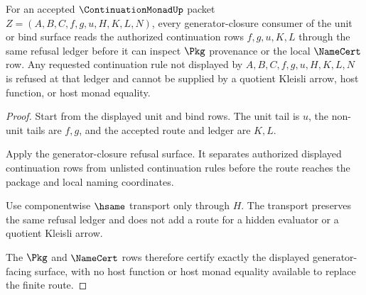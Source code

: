 \begin{theorem}
\label{thm:continuation-monad-generator-refusal-row}
For an accepted $\ContinuationMonadUp$ packet
$Z=(A,B,C,f,g,u,H,K,L,N)$, every generator-closure consumer of the unit or bind
surface reads the authorized continuation rows $f,g,u,K,L$ through the same
refusal ledger before it can inspect $\Pkg$ provenance or the local
$\NameCert$ row. Any requested continuation rule not displayed by
$A,B,C,f,g,u,H,K,L,N$ is refused at that ledger and cannot be supplied by a
quotient Kleisli arrow, host function, or host monad equality.
\end{theorem}
\begin{proof}
Start from the displayed unit and bind rows. The unit tail is $u$, the non-unit
tails are $f,g$, and the accepted route and ledger are $K,L$.

Apply the generator-closure refusal surface. It separates authorized displayed
continuation rows from unlisted continuation rules before the route reaches the
package and local naming coordinates.

Use componentwise $\hsame$ transport only through $H$. The transport preserves
the same refusal ledger and does not add a route for a hidden evaluator or a
quotient Kleisli arrow.

The $\Pkg$ and $\NameCert$ rows therefore certify exactly the displayed
generator-facing surface, with no host function or host monad equality available
to replace the finite route.
\end{proof}

